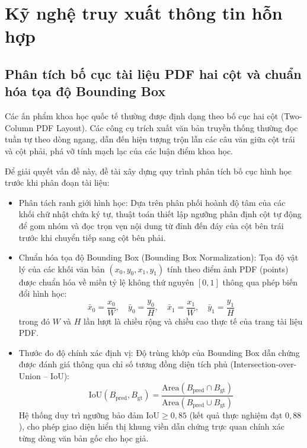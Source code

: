 \section{Kỹ nghệ truy xuất thông tin hỗn hợp}
\label{sec:hybrid_retrieval}

\subsection{Phân tích bố cục tài liệu PDF hai cột và chuẩn hóa tọa độ Bounding Box}
\label{subsec:pdf_layout_bbox}
Các ấn phẩm khoa học quốc tế thường được định dạng theo bố cục hai cột (Two-Column PDF Layout). Các công cụ trích xuất văn bản truyền thống thường đọc tuần tự theo dòng ngang, dẫn đến hiện tượng trộn lẫn các câu văn giữa cột trái và cột phải, phá vỡ tính mạch lạc của các luận điểm khoa học.

Để giải quyết vấn đề này, đề tài xây dựng quy trình phân tích bố cục hình học trước khi phân đoạn tài liệu:
\begin{itemize}
    \item Phân tách ranh giới hình học: Dựa trên phân phối hoành độ tâm của các khối chữ nhật chứa ký tự, thuật toán thiết lập ngưỡng phân định cột tự động để gom nhóm và đọc trọn vẹn nội dung từ đỉnh đến đáy của cột bên trái trước khi chuyển tiếp sang cột bên phải.
    \item Chuẩn hóa tọa độ Bounding Box (Bounding Box Normalization): Tọa độ vật lý của các khối văn bản $(x_0, y_0, x_1, y_1)$ tính theo điểm ảnh PDF (points) được chuẩn hóa về miền tỷ lệ không thứ nguyên $[0, 1]$ thông qua phép biến đổi hình học:
    \begin{equation}
    \label{eq:bbox_norm}
    \bar{x}_0 = \frac{x_0}{W}, \quad \bar{y}_0 = \frac{y_0}{H}, \quad \bar{x}_1 = \frac{x_1}{W}, \quad \bar{y}_1 = \frac{y_1}{H}
    \end{equation}
    trong đó $W$ và $H$ lần lượt là chiều rộng và chiều cao thực tế của trang tài liệu PDF.
    \item Thước đo độ chính xác định vị: Độ trùng khớp của Bounding Box dẫn chứng được đánh giá thông qua chỉ số tương đồng diện tích phủ (Intersection-over-Union -- IoU):
    \begin{equation}
    \label{eq:iou_metric}
    \text{IoU}(B_{\text{pred}}, B_{\text{gt}}) = \frac{\text{Area}(B_{\text{pred}} \cap B_{\text{gt}})}{\text{Area}(B_{\text{pred}} \cup B_{\text{gt}})}
    \end{equation}
    Hệ thống duy trì ngưỡng bảo đảm $\text{IoU} \ge 0{,}85$ (kết quả thực nghiệm đạt $0{,}88$), cho phép giao diện hiển thị khung viền dẫn chứng trực quan chính xác từng dòng văn bản gốc cho học giả.
\end{itemize}

